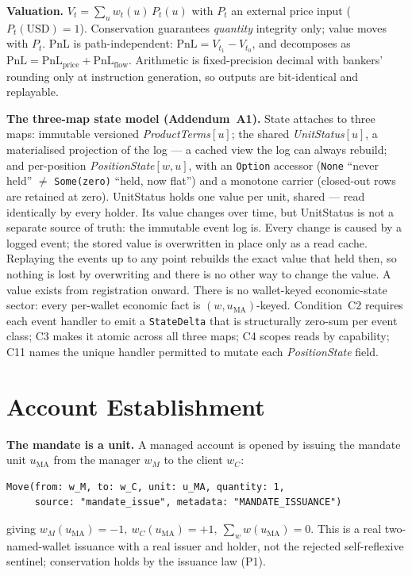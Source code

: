 \documentclass[11pt,a4paper]{article}
\begin{document}
\noindent\textbf{Valuation.} $V_t=\sum_{u}w_t(u)\,P_t(u)$ with $P_t$ an external price input
($P_t(\text{USD})=1$). Conservation guarantees \emph{quantity} integrity only; value moves with
$P_t$. PnL is path-independent: $\mathrm{PnL}=V_{t_1}-V_{t_0}$, and decomposes as
$\mathrm{PnL}=\mathrm{PnL}_{\text{price}}+\mathrm{PnL}_{\text{flow}}$. Arithmetic is
fixed-precision decimal with bankers' rounding only at instruction generation, so outputs are
bit-identical and replayable.

\noindent\textbf{The three-map state model (Addendum~A1).} State attaches to three maps:
immutable versioned \textit{ProductTerms}$[u]$; the shared \textit{UnitStatus}$[u]$, a
materialised projection of the log --- a cached view the log can always rebuild; and
per-position \textit{PositionState}$[w,u]$, with an \texttt{Option} accessor (\texttt{None}
``never held'' $\neq$ \texttt{Some(zero)} ``held, now flat'') and a monotone carrier (closed-out
rows are retained at zero). UnitStatus holds one value per unit, shared --- read identically by
every holder. Its value changes over time, but UnitStatus is not a separate source of truth: the
immutable event log is. Every change is caused by a logged event; the stored value is overwritten
in place only as a read cache. Replaying the events up to any point rebuilds the exact value that
held then, so nothing is lost by overwriting and there is no other way to change the value. A value
exists from registration onward. There is no wallet-keyed economic-state sector: every per-wallet
economic fact is $(w,u_{\mathrm{MA}})$-keyed. Condition~C2 requires each event handler to emit a
\texttt{StateDelta} that is structurally zero-sum per event class; C3 makes it atomic across all
three maps; C4 scopes reads by capability; C11 names the unique handler permitted to mutate each
\textit{PositionState} field.

\section{Account Establishment}
\label{sec:establishment}

\noindent\textbf{The mandate is a unit.} A managed account is opened by issuing the mandate unit
$u_{\mathrm{MA}}$ from the manager $w_M$ to the client $w_C$:
\begin{lstlisting}
Move(from: w_M, to: w_C, unit: u_MA, quantity: 1,
     source: "mandate_issue", metadata: "MANDATE_ISSUANCE")
\end{lstlisting}
giving $w_M(u_{\mathrm{MA}})=-1,\ w_C(u_{\mathrm{MA}})=+1,\ \sum_w w(u_{\mathrm{MA}})=0$. This is
a real two-named-wallet issuance with a real issuer and holder, not the rejected self-reflexive
sentinel; conservation holds by the issuance law (P1).
\end{document}
